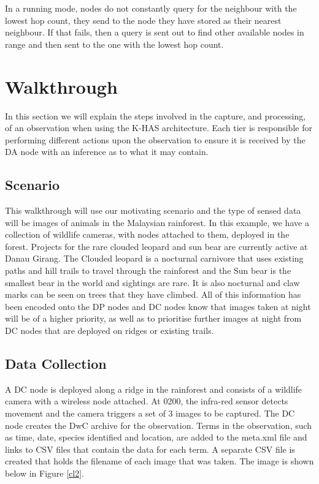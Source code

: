 		In a running mode, nodes do not constantly query for the neighbour with the lowest hop count, they send to the node they have stored as their nearest neighbour. If that fails, then a query is sent out to find other available nodes in range and then sent to the one with the lowest hop count. 

	
	\section{Walkthrough}
		In this section we will explain the steps involved in the capture, and processing, of an observation when using the K-HAS architecture. Each tier is responsible for performing different actions upon the observation to ensure it is received by the DA node with an inference as to what it may contain.
		
		\subsection{Scenario}
			This walkthrough will use our motivating scenario and the type of sensed data will be images of animals in the Malaysian rainforest. In this example, we have a collection of wildlife cameras, with nodes attached to them, deployed in the forest. Projects for the rare clouded leopard and sun bear are currently active at Danau Girang. The Clouded leopard is a nocturnal carnivore that uses existing paths and hill trails to travel through the rainforest and the Sun bear is the smallest bear in the world and sightings are rare. It is also nocturnal and claw marks can be seen on trees that they have climbed. All of this information has been encoded onto the DP nodes and DC nodes know that images taken at night will be of a higher priority, as well as to prioritise further images at night from DC nodes that are deployed on ridges or existing trails.
			
		\subsection{Data Collection}
			A DC node is deployed along a ridge in the rainforest and consists of a wildlife camera with a wireless node attached. At 0200, the infra-red sensor detects movement and the camera triggers a set of 3 images to be captured. The DC node creates the DwC archive for the observation. Terms in the observation, such as time, date, species identified and location, are added to the meta.xml file and links to CSV files that contain the data for each term. A separate CSV file is created that holds the filename of each image that was taken. The image is shown below in Figure \ref{cl2}.
			
